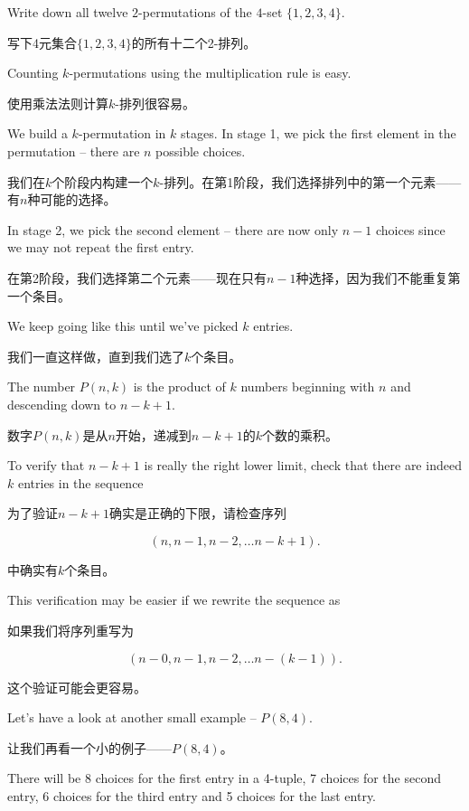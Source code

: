 \begin{exer}
Write down all twelve $2$-permutations of the $4$-set $\{1,2,3,4\}$.
\end{exer}

\begin{exer}
写下4元集合$\{1,2,3,4\}$的所有十二个2-排列。
\end{exer}

Counting $k$-permutations using the multiplication rule is easy.

使用乘法法则计算$k$-排列很容易。

We
build a $k$-permutation in $k$ stages.  In stage 1, we pick the first 
element in the permutation -- there are $n$ possible choices.

我们在$k$个阶段内构建一个$k$-排列。在第1阶段，我们选择排列中的第一个元素——有$n$种可能的选择。

In
stage 2, we pick the second element -- there are now only $n-1$ choices
since we may not repeat the first entry.

在第2阶段，我们选择第二个元素——现在只有$n-1$种选择，因为我们不能重复第一个条目。

We keep going like this until 
we've picked $k$ entries.

我们一直这样做，直到我们选了$k$个条目。

The number $P(n,k)$ is the product of $k$
numbers beginning with $n$ and descending down to $n-k+1$.

数字$P(n,k)$是从$n$开始，递减到$n-k+1$的$k$个数的乘积。

To verify 
that $n-k+1$ is really the right lower limit, check that there are indeed
$k$ entries in the sequence

为了验证$n-k+1$确实是正确的下限，请检查序列

\[ (n, n-1, n-2, \ldots n-k+1). \]

中确实有$k$个条目。

This verification may be easier if we rewrite the sequence as

如果我们将序列重写为

\[ (n-0, n-1, n-2, \ldots n-(k-1) ). \]

这个验证可能会更容易。

Let's have a look at another small example -- $P(8,4)$.

让我们再看一个小的例子——$P(8,4)$。

There will be 8
choices for the first entry in a 4-tuple, 7 choices for the second
entry, 6 choices for the third entry and 5 choices for the last entry.

